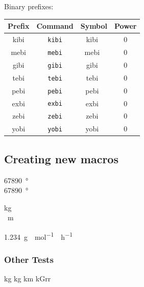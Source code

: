 \documentclass{article}
\def\Backslash{\copy\slashbox}
\begin{document}
Binary prefixes:
\begin{center}
\newcommand{\showBinaryPrefix}[1]{%
  \stepcounter{tablerow}%
  #1 & \texttt{\Backslash#1} & \unit{\csname #1\endcsname\noop} & \arabic{tablerow}0
}
\begin{tabular}{cccc}\toprule
Prefix & Command & Symbol & Power \\\midrule
\showBinaryPrefix{kibi} \\
\showBinaryPrefix{mebi} \\
\showBinaryPrefix{gibi} \\
\showBinaryPrefix{tebi} \\
\showBinaryPrefix{pebi} \\
\showBinaryPrefix{exbi} \\
\showBinaryPrefix{zebi} \\
\showBinaryPrefix{yobi} \\\bottomrule
\end{tabular}
\end{center}

\subsection{Creating new macros}

\qty{67890}{\degree} \\
\qty[quantity-product = \,]{67890}{\degree}

\unit{\kilogram\tothefourth}\\
\unit{\quartic\metre}

\qty{1.234}{\gram\polymer\per\mole\catalyst\per\hour}

\subsubsection{Other Tests}
\unit{\kilogram}
\unit{\kilo\gram}
{
\def\killermeater{\kilo\meter}
\unit{\killermeater}
}
{
\def\gram{Grr}
\unit{\kilo\gram}
}

\unit{\abbra}\\
\unit{\abbrb}\\
\unit{\abbrc}\\
\unit{\abbrd}\\
\unit{\abbre}
\end{document}
